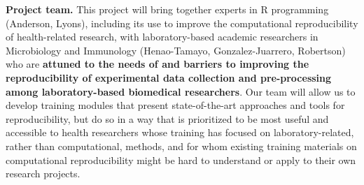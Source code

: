 \documentclass[pdftex,english,11pt,parskip=half]{scrartcl}
\begin{document}

\textbf{Project team.}  This project will bring together experts in R programming (Anderson, Lyons), including its use to improve the computational reproducibility of health-related research, with laboratory-based academic researchers in Microbiology and Immunology (Henao-Tamayo, Gonzalez-Juarrero, Robertson) who are \textbf{attuned to the needs of and barriers to improving the reproducibility of experimental data collection and pre-processing among laboratory-based biomedical researchers}. Our team will allow us to develop training modules that present state-of-the-art approaches and tools for reproducibility, but do so in a way that is prioritized to be most useful and accessible to health researchers whose training has focused on laboratory-related, rather than computational, methods, and for whom existing training materials on computational reproducibility might be hard to understand or apply to their own research projects. 

\endgroup
\end{document}

